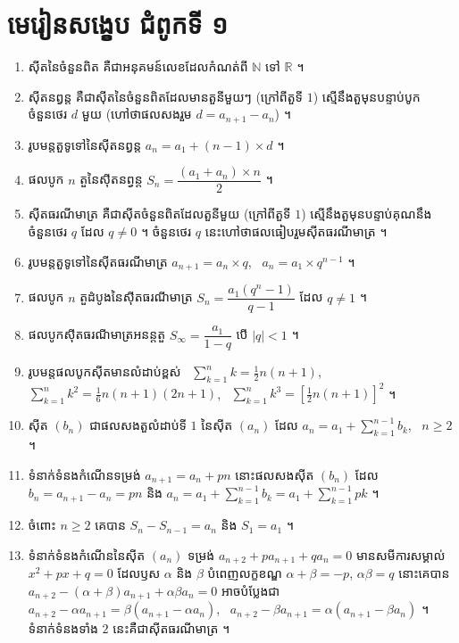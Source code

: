 \section*{មេរៀនសង្ខេប ជំពូកទី ១}
\begin{note}[មេរៀនសង្ខេប]
\begin{enumerate}[1]
  \item ស៊ីតនៃចំនួនពិត គឺជាអនុគមន៍លេខដែលកំណត់ពី $\mathbb{N}$ ទៅ $\mathbb{R}$ ។
  \item ស៊ីតនព្វន្ត គឺជាស៊ីតនៃចំនួនពិតដែលមានតួនីមួយៗ (ក្រៅពីតួទី $1$) ស្មើនឹងតួមុនបន្ទាប់បូកចំនួនថេរ $d$ មួយ (ហៅថាផលសងរួម $d = a_{n+1} - a_n$) ។
  \item រូបមន្តតួទូទៅនៃស៊ីតនព្វន្ត $a_n = a_1 + (n - 1) \times d$ ។
  \item ផលបូក $n$ តួនៃស៊ីតនព្វន្ត $S_n = \dfrac{(a_1 + a_n) \times n}{2}$ ។
  \item ស៊ីតធរណីមាត្រ គឺជាស៊ីតចំនួនពិតដែលតួនីមួយ (ក្រៅពីតួទី $1$) ស្មើនឹងតួមុនបន្ទាប់គុណនឹងចំនួនថេរ $q$ ដែល $q \ne 0$ ។ ចំនួនថេរ $q$ នេះហៅថាផលធៀបរួមស៊ីតធរណីមាត្រ ។
  \item រូបមន្តតួទូទៅនៃស៊ីតធរណីមាត្រ $a_{n+1} = a_n \times q$, \ $a_n = a_1 \times q^{n-1}$ ។
  \item ផលបូក $n$ តួដំបូងនៃស៊ីតធរណីមាត្រ $S_n = \dfrac{a_1(q^n - 1)}{q - 1}$ ដែល $q \ne 1$ ។
  \item ផលបូកស៊ីតធរណីមាត្រអនន្តតួ $S_\infty = \dfrac{a_1}{1 - q}$ បើ $|q| < 1$ ។
  \item រូបមន្តផលបូកស៊ីតមានលំដាប់ខ្ពស់ \
  $\displaystyle\sum_{k=1}^{n} k = \frac{1}{2}n(n + 1)$, \ $\displaystyle\sum_{k=1}^{n} k^2 = \frac{1}{6}n(n + 1)(2n + 1)$, \ $\displaystyle\sum_{k=1}^{n} k^3 = \left[\frac{1}{2}n(n + 1)\right]^2$ ។
  \item ស៊ីត $(b_n)$ ជាផលសងតួលំដាប់ទី $1$ នៃស៊ីត $(a_n)$ ដែល $a_n = a_1 + \displaystyle\sum_{k=1}^{n-1} b_k$, \ $n \ge 2$ ។
  \item ទំនាក់ទំនងកំណើនទម្រង់ $a_{n+1} = a_n + pn$ នោះផលសងស៊ីត $(b_n)$ ដែល $b_n = a_{n+1} - a_n = pn$ និង $a_n = a_1 + \displaystyle\sum_{k=1}^{n-1} b_k = a_1 + \sum_{k=1}^{n-1} pk$ ។
  \item ចំពោះ $n \ge 2$ គេបាន $S_n - S_{n-1} = a_n$ និង $S_1 = a_1$ ។
  \item ទំនាក់ទំនងកំណើននៃស៊ីត $(a_n)$ ទម្រង់ $a_{n+2} + pa_{n+1} + qa_n = 0$ មានសមីការសម្គាល់ $x^2 + px + q = 0$ ដែលឫស $\alpha$ និង $\beta$ បំពេញលក្ខខណ្ឌ $\alpha + \beta = -p$, $\alpha\beta = q$ នោះគេបាន $a_{n+2} - (\alpha + \beta)a_{n+1} + \alpha\beta a_n = 0$ អាចបំប្លែងជា $a_{n+2} - \alpha a_{n+1} = \beta(a_{n+1} - \alpha a_n)$, \ $a_{n+2} - \beta a_{n+1} = \alpha(a_{n+1} - \beta a_n)$ ។ ទំនាក់ទំនងទាំង $2$ នេះគឺជាស៊ីតធរណីមាត្រ ។

\end{enumerate}
\end{note}
